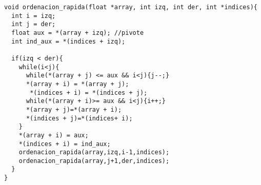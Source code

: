 \begin{lstlisting}
void ordenacion_rapida(float *array, int izq, int der, int *indices){
  int i = izq;
  int j = der;
  float aux = *(array + izq); //pivote
  int ind_aux = *(indices + izq);

  if(izq < der){
    while(i<j){
      while(*(array + j) <= aux && i<j){j--;}
      *(array + i) = *(array + j);
       *(indices + i) = *(indices + j);
      while(*(array + i)>= aux && i<j){i++;}
      *(array + j)=*(array + i);
      *(indices + j)=*(indices+ i);
    }
    *(array + i) = aux;
    *(indices + i) = ind_aux;
    ordenacion_rapida(array,izq,i-1,indices);
    ordenacion_rapida(array,j+1,der,indices);
  }
}
\end{lstlisting}

\vspace{5mm}
